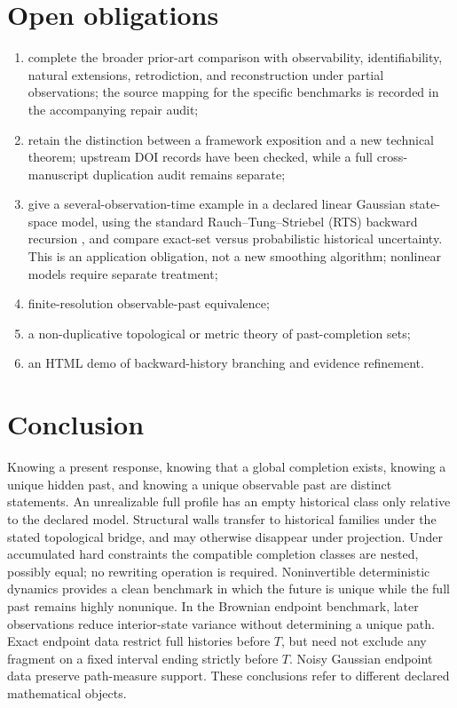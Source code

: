 \documentclass[11pt]{article}
\begin{document}
\section{Open obligations}
\begin{enumerate}
\item complete the broader prior-art comparison with observability,
identifiability, natural extensions, retrodiction, and reconstruction
under partial observations; the source mapping for the specific
benchmarks is recorded in the accompanying repair audit;
\item retain the distinction between a framework exposition and a new
technical theorem; upstream DOI records have been checked, while a full
cross-manuscript duplication audit remains separate;
\item give a several-observation-time example in a declared linear
Gaussian state-space model, using the standard Rauch--Tung--Striebel
(RTS) backward recursion \cite[Section 3.2]{RauchTungStriebel1965}
\cite[Section 12.2, Theorem 12.2]{SarkkaSvensson2023}, and compare
exact-set versus probabilistic historical uncertainty. This is an
application obligation, not a new smoothing algorithm; nonlinear
models require separate treatment;
\item finite-resolution observable-past equivalence;
\item a non-duplicative topological or metric theory of past-completion sets;
\item an HTML demo of backward-history branching and evidence refinement.
\end{enumerate}

\section*{Conclusion}
Knowing a present response, knowing that a global completion exists, knowing a unique hidden past, and knowing a unique observable past are distinct statements. An unrealizable full profile has an empty historical class only relative to the declared model. Structural walls transfer to historical families under the stated topological bridge, and may otherwise disappear under projection. Under accumulated hard constraints the compatible completion classes are nested, possibly equal; no rewriting operation is required. Noninvertible deterministic dynamics provides a clean benchmark in which the future is unique while the full past remains highly nonunique. In the Brownian endpoint benchmark, later observations reduce
interior-state variance without determining a unique path. Exact
endpoint data restrict full histories before $T$, but need not exclude
any fragment on a fixed interval ending strictly before $T$. Noisy
Gaussian endpoint data preserve path-measure support. These conclusions
refer to different declared mathematical objects.
\end{document}
